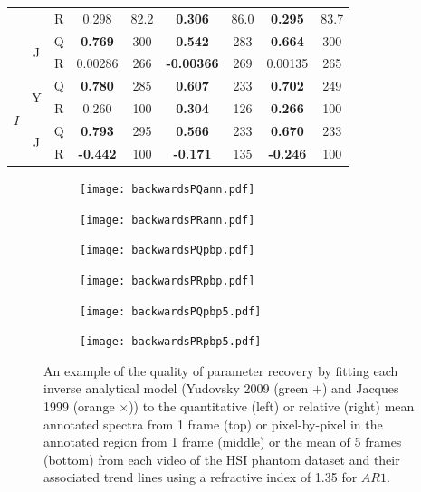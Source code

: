 \begin{table}[h!]
\begin{tabular}{|ccc|cc|cc|cc|}
        & & R & 0.298 & 82.2 & \textbf{0.306} & 86.0 & \textbf{0.295} & 83.7 \\
        \cline{2-9}
        & \multirow{2}{*}{J} & Q & \textbf{0.769} & 300 & \textbf{0.542} & 283 & \textbf{0.664} & 300 \\
        & & R & 0.00286 & 266 & \textbf{-0.00366} & 269 & 0.00135 & 265 \\
        \hline
        \multirow{4}{*}{$I$} & \multirow{2}{*}{Y} & Q & \textbf{0.780} & 285 & \textbf{0.607} & 233 & \textbf{0.702} & 249 \\
        & & R & 0.260 & 100 & \textbf{0.304} & 126 & \textbf{0.266} & 100 \\
        \cline{2-9}
        & \multirow{2}{*}{J} & Q & \textbf{0.793} & 295 & \textbf{0.566} & 233 & \textbf{0.670} & 233 \\
        & & R & \textbf{-0.442} & 100 & \textbf{-0.171} & 135 & \textbf{-0.246} & 100 \\
        \hline
    \end{tabular}    
    \label{tb:backwardsHSIphantomsann}
\end{table}

\begin{figure}[h!]
    \centering
    \begin{subfigure}{0.49\textwidth}
        \texttt{[image: backwardsPQann.pdf]}
        \caption{}
        \label{fig:backwardsPQann}
    \end{subfigure}
    \begin{subfigure}{0.49\textwidth}
        \texttt{[image: backwardsPRann.pdf]}
        \caption{}
        \label{fig:backwardsPRann}
    \end{subfigure}
    \begin{subfigure}{0.49\textwidth}
        \texttt{[image: backwardsPQpbp.pdf]}
        \caption{}
        \label{fig:backwardsPQpbp}
    \end{subfigure}
    \begin{subfigure}{0.49\textwidth}
        \texttt{[image: backwardsPRpbp.pdf]}
        \caption{}
        \label{fig:backwardsPRpbp}
    \end{subfigure}
    \begin{subfigure}{0.49\textwidth}
        \texttt{[image: backwardsPQpbp5.pdf]}
        \caption{}
        \label{fig:backwardsPQpbp5}
    \end{subfigure}
    \begin{subfigure}{0.49\textwidth}
        \texttt{[image: backwardsPRpbp5.pdf]}
        \caption{}
        \label{fig:backwardsPRpbp5}
    \end{subfigure}
    \caption{An example of the quality of parameter recovery by fitting each inverse analytical model (Yudovsky 2009 (\textcolor{MyGreen}{green $+$}) and Jacques 1999 (\textcolor{MyOrange}{orange $\times$})) to the quantitative (left) or relative (right) mean annotated spectra from 1 frame (top) or pixel-by-pixel in the annotated region from 1 frame (middle) or the mean of 5 frames (bottom) from each video of the HSI phantom dataset and their associated trend lines using a refractive index of 1.35 for $AR1$.}
    \label{fig:backwardsHSIphantomsann}
\end{figure}

